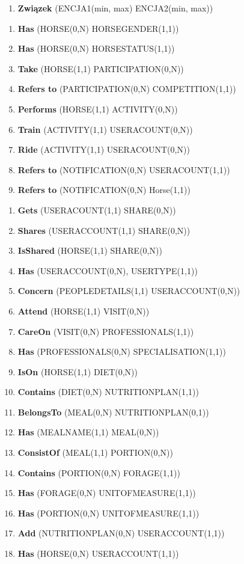 \documentclass[12pt,oneside]{report}
\begin{document}
	\begin{enumerate}[start=0,label={\bfseries ZWI$\backslash$xx}]
		\item \textbf{Związek} (ENCJA1(min, max) ENCJA2(min, max))
	\end{enumerate}
	\begin{enumerate}[start=1,label={\bfseries ZWI$\backslash$0\arabic*}]
		\item \textbf{Has} (HORSE(0,N) HORSEGENDER(1,1))
		\item \textbf{Has} (HORSE(0,N) HORSESTATUS(1,1))
		\item \textbf{Take} (HORSE(1,1) PARTICIPATION(0,N))
		\item \textbf{Refers to} (PARTICIPATION(0,N) COMPETITION(1,1))
		\item \textbf{Performs} (HORSE(1,1) ACTIVITY(0,N))
		\item \textbf{Train} (ACTIVITY(1,1) USERACOUNT(0,N))		
		\item \textbf{Ride} (ACTIVITY(1,1) USERACOUNT(0,N))
		\item \textbf{Refers to} (NOTIFICATION(0,N) USERACOUNT(1,1))		
		\item \textbf{Refers to} (NOTIFICATION(0,N) Horse(1,1))	
	\end{enumerate}
	\begin{enumerate}[start=10,label={\bfseries ZWI$\backslash$\arabic*}]	
		\item \textbf{Gets} (USERACOUNT(1,1) SHARE(0,N))
		\item \textbf{Shares} (USERACCOUNT(1,1) SHARE(0,N))
		\item \textbf{IsShared} (HORSE(1,1) SHARE(0,N))
		\item \textbf{Has} (USERACCOUNT(0,N), USERTYPE(1,1))
		\item \textbf{Concern} (PEOPLEDETAILS(1,1) USERACCOUNT(0,N))
		\item \textbf{Attend} (HORSE(1,1) VISIT(0,N))
		\item \textbf{CareOn} (VISIT(0,N) PROFESSIONALS(1,1))
		\item \textbf{Has} (PROFESSIONALS(0,N) SPECIALISATION(1,1))
		\item \textbf{IsOn} (HORSE(1,1) DIET(0,N))
		\item \textbf{Contains} (DIET(0,N) NUTRITIONPLAN(1,1))
		\item \textbf{BelongsTo} (MEAL(0,N) NUTRITIONPLAN(0,1))
		\item \textbf{Has} (MEALNAME(1,1) MEAL(0,N))		
		\item \textbf{ConsistOf} (MEAL(1,1) PORTION(0,N))
		\item \textbf{Contains} (PORTION(0,N) FORAGE(1,1))
		\item \textbf{Has} (FORAGE(0,N) UNITOFMEASURE(1,1))
		\item \textbf{Has} (PORTION(0,N) UNITOFMEASURE(1,1))
		\item \textbf{Add} (NUTRITIONPLAN(0,N) USERACCOUNT(1,1))
		\item \textbf{Has} (HORSE(0,N) USERACCOUNT(1,1))
	\end{enumerate}
\end{document}
